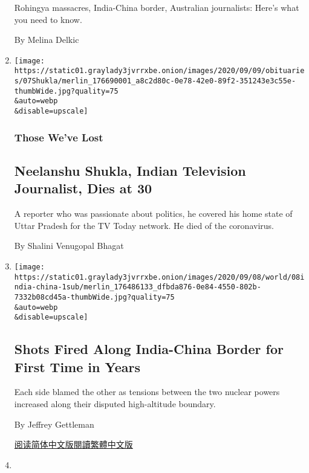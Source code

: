 \begin{enumerate}
  Rohingya massacres, India-China border, Australian journalists: Here's
  what you need to know.

  By Melina Delkic
\item
  \href{/2020/09/08/obituaries/neelanshu-shukla-dead-coronavirus.html}{}

  \texttt{[image: https://static01.graylady3jvrrxbe.onion/images/2020/09/09/obituaries/07Shukla/merlin\_176690001\_a8c2d80c-0e78-42e0-89f2-351243e3c55e-thumbWide.jpg?quality=75\\\&auto=webp\\\&disable=upscale]}

  \hypertarget{those-weve-lost}{%
  \subsubsection{Those We've Lost}\label{those-weve-lost}}

  \hypertarget{neelanshu-shukla-indian-television-journalist-dies-at-30}{%
  \subsection{Neelanshu Shukla, Indian Television Journalist, Dies at
  30}\label{neelanshu-shukla-indian-television-journalist-dies-at-30}}

  A reporter who was passionate about politics, he covered his home
  state of Uttar Pradesh for the TV Today network. He died of the
  coronavirus.

  By Shalini Venugopal Bhagat
\item
  \href{/2020/09/08/world/asia/india-china-border.html}{}

  \texttt{[image: https://static01.graylady3jvrrxbe.onion/images/2020/09/08/world/08india-china-1sub/merlin\_176486133\_dfbda876-0e84-4550-802b-7332b08cd45a-thumbWide.jpg?quality=75\\\&auto=webp\\\&disable=upscale]}

  \hypertarget{shots-fired-along-india-china-border-for-first-time-in-years}{%
  \subsection{Shots Fired Along India-China Border for First Time in
  Years}\label{shots-fired-along-india-china-border-for-first-time-in-years}}

  Each side blamed the other as tensions between the two nuclear powers
  increased along their disputed high-altitude boundary.

  By Jeffrey Gettleman

  \href{https://cn.nytimes3xbfgragh.onion/world/20200909/india-china-border/}{阅读简体中文版}\href{https://cn.nytimes3xbfgragh.onion/world/20200909/india-china-border/zh-hant/}{閱讀繁體中文版}
\item
  \href{/2020/09/08/world/asia/hong-kong-girl-police-video.html}{}


\end{enumerate}

